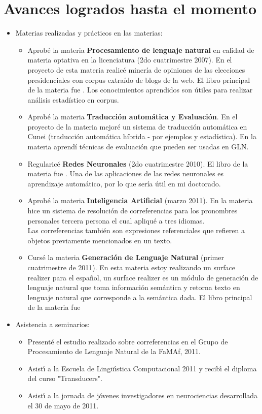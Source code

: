 \section{Avances logrados hasta el momento}
\label{progreso}
\begin{itemize}
\item Materias realizadas y pr\'acticos en las materias:
\begin{itemize}
\item Aprob\'e la materia {\bf Procesamiento de lenguaje natural} en calidad de materia optativa en la licenciatura (2do cuatrimestre 2007). En el proyecto de esta materia realic\'e miner\'ia de opiniones de las elecciones presidenciales con corpus extra\'ido de blogs de la web. El libro principal de la materia fue \cite{Manning2000}. Los conocimientos aprendidos son \'utiles para realizar an\'alisis estad\'istico en corpus.
\item Aprob\'e la materia {\bf Traducci\'on autom\'atica y Evaluaci\'on}. En el proyecto de la materia mejor\'e un sistema de traducci\'on autom\'atica en Cunei (traducci\'on autom\'atica h\'ibrida - por ejemplos y estad\'istica).
En la materia aprend\'i t\'ecnicas de evaluaci\'on que pueden ser usadas en GLN. 
\item Regularic\'e {\bf Redes Neuronales} (2do cuatrimestre 2010). El libro de la materia fue \cite{Hertz1991}. Una de las aplicaciones de las redes neuronales es aprendizaje autom\'atico, por lo que ser\'ia \'util en mi doctorado.
\item Aprob\'e la materia {\bf Inteligencia Artificial} (marzo 2011). En la materia hice un sistema de resoluci\'on de correferencias para los pronombres personales tercera persona el cual apliqu\'e a tres idiomas.\\
Las correferencias tambi\'en son expresiones referenciales que refieren a objetos previamente mencionados en un texto.
\item Curs\'e la materia {\bf Generaci\'on de Lenguaje Natural} (primer cuatrimestre de 2011). En esta materia estoy realizando un surface realizer para el espa\~{n}ol, un surface realizer es un m\'odulo de generaci\'on de lenguaje natural que toma informaci\'on sem\'antica y retorna texto en lenguaje natural que corresponde a la sem\'antica dada. El libro principal de la materia fue \cite{Reiter2000}
\end{itemize}
\item Asistencia a seminarios:
\begin{itemize}
\item Present\'e el estudio realizado sobre correferencias en el Grupo de Procesamiento de Lenguaje Natural de la FaMAf, 2011.
\item Asist\'{\i} a la Escuela de Ling\"u\'{\i}stica Computacional 2011 y recib\'{\i} el diploma del curso "Transducers".
\item Asist\'{\i} a la jornada de j\'ovenes investigadores en neurociencias desarrollada el 30 de mayo de 2011.
\end{itemize}
\end{itemize}
